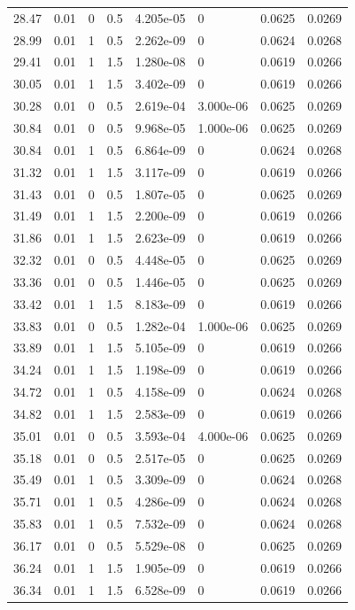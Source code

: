 \documentclass[preview]{standalone}
\begin{document}
{{{\begin{tabular}{L{1.2cm}C{1.2cm} C{0.3cm}C{0.5cm} C{1.4cm}C{1.4cm} C{1.4cm}C{1.4cm}}
  28.47  &  0.01  & 0     & 0.5 &  4.205e-05  & 0  & 0.0625 &  0.0269   \\ 
  28.99  &  0.01  & 1     & 0.5 &  2.262e-09  & 0  & 0.0624 &  0.0268   \\ 
  29.41  &  0.01  & 1     & 1.5 &  1.280e-08  & 0  & 0.0619 &  0.0266   \\ 
  30.05  &  0.01  & 1     & 1.5 &  3.402e-09  & 0  & 0.0619 &  0.0266   \\ 
  30.28  &  0.01  & 0     & 0.5 &  2.619e-04  & 3.000e-06  & 0.0625 &  0.0269   \\ 
  30.84  &  0.01  & 0     & 0.5 &  9.968e-05  & 1.000e-06  & 0.0625 &  0.0269   \\ 
  30.84  &  0.01  & 1     & 0.5 &  6.864e-09  & 0  & 0.0624 &  0.0268   \\ 
  31.32  &  0.01  & 1     & 1.5 &  3.117e-09  & 0  & 0.0619 &  0.0266   \\ 
  31.43  &  0.01  & 0     & 0.5 &  1.807e-05  & 0  & 0.0625 &  0.0269   \\ 
  31.49  &  0.01  & 1     & 1.5 &  2.200e-09  & 0  & 0.0619 &  0.0266   \\ 
  31.86  &  0.01  & 1     & 1.5 &  2.623e-09  & 0  & 0.0619 &  0.0266   \\ 
  32.32  &  0.01  & 0     & 0.5 &  4.448e-05  & 0  & 0.0625 &  0.0269   \\ 
  33.36  &  0.01  & 0     & 0.5 &  1.446e-05  & 0  & 0.0625 &  0.0269   \\ 
  33.42  &  0.01  & 1     & 1.5 &  8.183e-09  & 0  & 0.0619 &  0.0266   \\ 
  33.83  &  0.01  & 0     & 0.5 &  1.282e-04  & 1.000e-06  & 0.0625 &  0.0269   \\ 
  33.89  &  0.01  & 1     & 1.5 &  5.105e-09  & 0  & 0.0619 &  0.0266   \\ 
  34.24  &  0.01  & 1     & 1.5 &  1.198e-09  & 0  & 0.0619 &  0.0266   \\ 
  34.72  &  0.01  & 1     & 0.5 &  4.158e-09  & 0  & 0.0624 &  0.0268   \\ 
  34.82  &  0.01  & 1     & 1.5 &  2.583e-09  & 0  & 0.0619 &  0.0266   \\ 
  35.01  &  0.01  & 0     & 0.5 &  3.593e-04  & 4.000e-06  & 0.0625 &  0.0269   \\ 
  35.18  &  0.01  & 0     & 0.5 &  2.517e-05  & 0  & 0.0625 &  0.0269   \\ 
  35.49  &  0.01  & 1     & 0.5 &  3.309e-09  & 0  & 0.0624 &  0.0268   \\ 
  35.71  &  0.01  & 1     & 0.5 &  4.286e-09  & 0  & 0.0624 &  0.0268   \\ 
  35.83  &  0.01  & 1     & 0.5 &  7.532e-09  & 0  & 0.0624 &  0.0268   \\ 
  36.17  &  0.01  & 0     & 0.5 &  5.529e-08  & 0  & 0.0625 &  0.0269   \\ 
  36.24  &  0.01  & 1     & 1.5 &  1.905e-09  & 0  & 0.0619 &  0.0266   \\ 
  36.34  &  0.01  & 1     & 1.5 &  6.528e-09  & 0  & 0.0619 &  0.0266   \\ 
\hline 
\end{tabular} 

}}}
\end{document}
